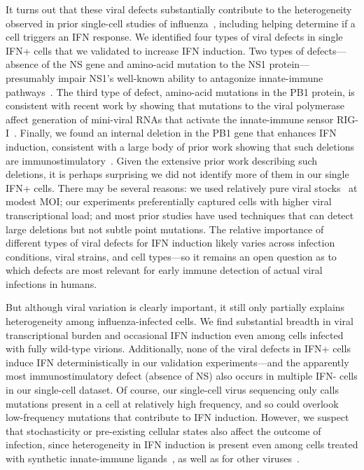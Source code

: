 \documentclass[10pt,letterpaper]{article}
\begin{document}
It turns out that these viral defects substantially contribute to the heterogeneity observed in prior single-cell studies of influenza~\citep{russell2018extreme, steuerman2018dissection, heldt2015single, sjaastad2018distinct}, including helping determine if a cell triggers an IFN response.
We identified four types of viral defects in single IFN+ cells that we validated to increase IFN induction. 
Two types of defects---absence of the NS gene and amino-acid mutation to the NS1 protein---presumably impair NS1's well-known ability to antagonize innate-immune pathways~\citep{garcia1998influenza, hale2008multifunctional}.
The third type of defect, amino-acid mutations in the PB1 protein, is consistent with recent work by showing that mutations to the viral polymerase affect generation of mini-viral RNAs that activate the innate-immune sensor RIG-I~\citep{velthuis2018mini}.
Finally, we found an internal deletion in the PB1 gene that enhances IFN induction, consistent with a large body of prior work showing that such deletions are immunostimulatory~\citep{baum2010preference, tapia2013defective, boergeling2015evidence, dimmock2015cloned}.
Given the extensive prior work describing such deletions, it is perhaps surprising we did not identify more of them in our single IFN+ cells.
There may be several reasons: we used relatively pure viral stocks~\citep{xue2016propagation} at modest MOI; our experiments preferentially captured cells with higher viral transcriptional load; and most prior studies have used techniques that can detect large deletions but not subtle point mutations.
The relative importance of different types of viral defects for IFN induction likely varies across infection conditions, viral strains, and cell types---so it remains an open question as to which defects are most relevant for early immune detection of actual viral infections in humans.

But although viral variation is clearly important, it still only partially explains heterogeneity among influenza-infected cells.
We find substantial breadth in viral transcriptional burden and occasional IFN induction even among cells infected with fully wild-type virions.
Additionally, none of the viral defects in IFN+ cells induce IFN deterministically in our validation experiments---and the apparently most immunostimulatory defect (absence of NS) also occurs in multiple IFN- cells in our single-cell dataset.
Of course, our single-cell virus sequencing only calls mutations present in a cell at relatively high frequency, and so could overlook low-frequency mutations that contribute to IFN induction.
However, we suspect that stochasticity or pre-existing cellular states also affect the outcome of infection, since heterogeneity in IFN induction is present even among cells treated with synthetic innate-immune ligands~\citep{shalek2013single, shalek2014single, wimmers2018single, bhushal2017cell}, as well as for other viruses~\citep{oneal2018west}.
\end{document}
